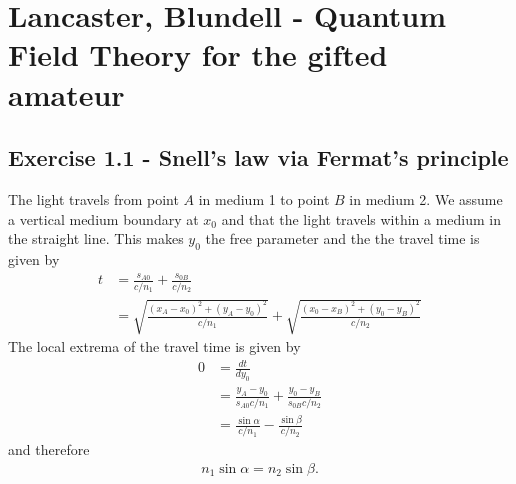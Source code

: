 \documentclass[../main.tex]{subfiles}
\begin{document}
\section{{\sc Lancaster, Blundell} - Quantum Field Theory for the gifted amateur}
\subsection*{Exercise 1.1 - Snell's law via Fermat's principle}
The light travels from point $A$ in medium 1 to point $B$ in medium 2. We assume a vertical medium boundary at $x_0$ and that the light travels within a medium in the straight line. This makes $y_0$ the free parameter and the the travel time is given by
\begin{align}
    t&=\frac{s_{A0}}{c/n_1}+\frac{s_{0B}}{c/n_2}\\
    &=\sqrt{\frac{(x_A-x_0)^2+(y_A-y_0)^2}{c/n_1}}+\sqrt{\frac{(x_0-x_B)^2+(y_0-y_B)^2}{c/n_2}}
\end{align}
The local extrema of the travel time is given by
\begin{align}
    0&=\frac{dt}{dy_0}\\
    &=\frac{y_A-y_0}{s_{A0}c/n_1}+\frac{y_0-y_B}{s_{0B}c/n_2}\\
    &=\frac{\sin\alpha}{c/n_1}-\frac{\sin\beta}{c/n_2}
\end{align}
and therefore
\begin{align}
n_1\sin\alpha=n_2\sin\beta.
\end{align}
\end{document}
